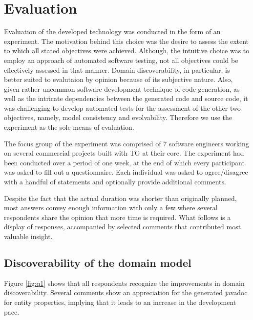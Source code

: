 \chapter{Evaluation}

Evaluation of the developed technology was conducted in the form of an experiment.
The motivation behind this choice was the desire to assess the extent to which all stated objectives were achieved.
Although, the intuitive choice was to employ an approach of automated software testing, not all objectives could be effectively assessed in that manner.
Domain discoverability, in particular, is better suited to evalutaion by opinion because of its subjective nature. 
Also, given rather uncommon software development technique of code generation, as well as the intricate dependencies between the generated code and source code, it was challenging to develop automated tests for the assessment of the other two objectives, namely, model consistency and evolvability. 
Therefore we use the experiment as the sole means of evaluation.

\n

The focus group of the experiment was comprised of 7 software engineers working on several commercial projects built with TG at their core.
The experiment had been conducted over a period of one week, at the end of which every participant was asked to fill out a questionnaire.
Each individual was asked to agree/disagree with a handful of statements and optionally provide additional comments.

\n

Despite the fact that the actual duration was shorter than originally planned, most answers convey enough information with only a few where several respondents share the opinion that more time is required. 
What follows is a display of responses, accompanied by selected comments that contributed most valuable insight.

\pagebreak
\section{Discoverability of the domain model}
Figure \ref{fig:q1} shows that all respondents recognize the improvements in domain discoverability.
Several comments show an appreciation for the generated javadoc for entity properties, implying that it leads to an increase in the development pace.


